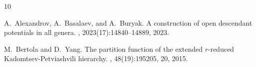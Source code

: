 \documentclass[11pt]{amsart}
\theoremstyle{definition}
\theoremstyle{remark}
\newcommand{\<}{\left<}
\renewcommand{\>}{\right>}
\numberwithin{equation}{section}
\begin{document}
\begin{thebibliography}{10}

A.~Alexandrov, A.~Basalaev, and %
A.~Buryak.
\newblock A construction of open descendant potentials in all genera.
,
  2023(17):14840--14889, 2023. %

M.~Bertola and %
D.~Yang.
\newblock The partition function of the extended {$r$}-reduced
  {K}adomtsev-{P}etviashvili hierarchy.
, 48(19):195205, 20, 2015.


\end{thebibliography}
\end{document}
